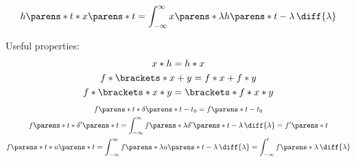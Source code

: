 \begin{multicols}{2}
\begin{CheatsheetEntryFrame}
    \end{CheatsheetEntryFrame}

    \begin{CheatsheetEntryFrame}

        \begin{equation*}
            h\parens*{t} * x\parens*{t}
            = \int_{-\infty}^\infty{
                x\parens*{\lambda} h\parens*{t - \lambda} \,\diff{\lambda}
            }
        \end{equation*}
        \vspace*{-2em}

        Useful properties:
        \begin{gather*}
            x * h = h * x
            \\
            f * \brackets*{x + y}
            = f * x + f * y
            \\
            f * \brackets*{x * y}
            = \brackets*{f * x} * y
        \end{gather*}
        \begin{gather*}
            f\parens*{t} * \delta\parens*{t - t_0}
            = f\parens*{t - t_0}
            \\
            f\parens*{t} * \delta'\parens*{t}
            = \int_{-\infty}^\infty {
                f\parens*{\lambda} \delta'\parens*{t - \lambda} \,\diff{\lambda}
            }
            = f'\parens*{t}
            \\
            f\parens*{t} * u\parens*{t}
            = \int_{-\infty}^\infty {
                f\parens*{\lambda} u\parens*{t - \lambda} \,\diff{\lambda}
            }
            = \int_{-\infty}^t f\parens*{\lambda} \,\diff{\lambda}
        \end{gather*}

    \end{CheatsheetEntryFrame}

    \newcommand{\TmpFTArrow}{{\color{mycontrastblue}\xRightarrow{\FourierTransform}}}

    \begin{CheatsheetEntryFrame}


\end{CheatsheetEntryFrame}
\end{multicols}
